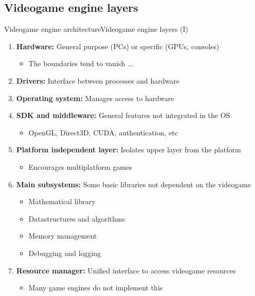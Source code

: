 \documentclass[10pt,compress]{beamer} %
\begin{document}
\subsection{Videogame engine layers}
\begin{frame}[plain]{Videogame engine architecture}{Videogame engine layers (I)}
	\begin{enumerate}
	\item \textbf{Hardware:} General purpose (PCs) or specific (GPUs, consoles)
		\begin{itemize}
		\item The boundaries tend to vanish ...
		\end{itemize}
	\item \textbf{Drivers:} Interface between processes and hardware
	\item \textbf{Operating system:} Manages access to hardware
	\item \textbf{SDK and middleware:} General features not integrated in the OS
		\begin{itemize}
		\item OpenGL, Direct3D, CUDA, authentication, etc
		\end{itemize}
	\item \textbf{Platform independent layer:} Isolates upper layer from the platform
		\begin{itemize}
		\item Encourages multiplatform games
		\end{itemize}
	\item \textbf{Main subsystems:} Some basic libraries not dependent on the videogame
		\begin{itemize}
		\item Mathematical library
		\item Datastructures and algorithms
		\item Memory management
		\item Debugging and logging
		\end{itemize}
	\item \textbf{Resource manager:} Unified interface to access videogame resources
		\begin{itemize}
		\item Many game engines do not implement this
		\end{itemize}
	\end{enumerate}
\end{frame}
\end{document}
